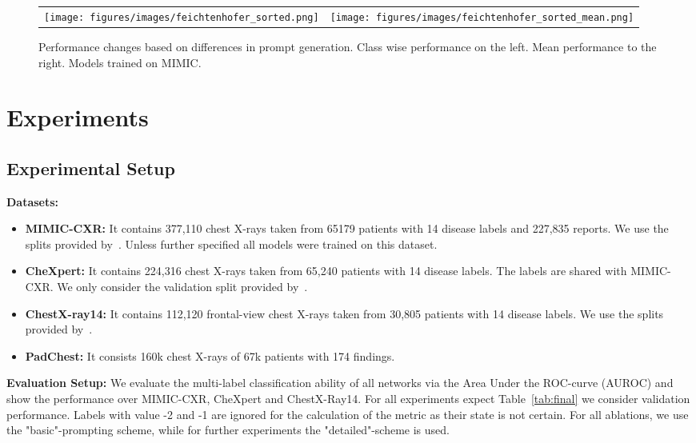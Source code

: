 \documentclass[runningheads]{llncs}
\begin{document}
 \begin{figure*}[t]
    \centering
    \begin{tabular}{cc}
       \texttt{[image: figures/images/feichtenhofer\_sorted.png]}  &  \texttt{[image: figures/images/feichtenhofer\_sorted\_mean.png]}
    \end{tabular}
    
    \caption{Performance changes based on differences in prompt generation. Class wise performance on the left. Mean performance to the right. Models trained on MIMIC.}
    \label{fig:prompts}
\end{figure*}

 

\section{Experiments}
\subsection{Experimental Setup}
\noindent\textbf{Datasets:}
\begin{itemize}
    \item \textbf{MIMIC-CXR: } It contains 377,110 
        chest X-rays taken from 65179 patients with 14 disease labels and 227,835 reports.
        We use the splits provided by~\cite{johnson2019mimic}. Unless further specified all models were trained on this dataset. 
\item \textbf{CheXpert: } It contains 224,316
    chest X-rays taken from 65,240 patients with 14 disease labels. The labels are shared with MIMIC-CXR.
    We only consider the validation split provided by~\cite{irvin2019chexpert}.
\item \textbf{ChestX-ray14: } It contains 112,120
frontal-view chest X-rays taken from 30,805 patients with 14 disease labels.
    We use the splits provided by~\cite{seibold2020self}.
    \item \textbf{PadChest: } It consists  160k
    chest X-rays of 67k patients with 174 findings.
\end{itemize}
\noindent\textbf{Evaluation Setup: } We evaluate the multi-label classification ability of all networks via the Area Under the ROC-curve (AUROC) and show the performance over MIMIC-CXR, CheXpert and ChestX-Ray14. For all experiments expect Table~\ref{tab:final} we consider validation performance. Labels with value -2 and -1 are ignored for the calculation of the metric as their state is not certain. For all ablations, we use the "basic"-prompting scheme, while for further experiments the "detailed"-scheme is used. 
\end{document}
